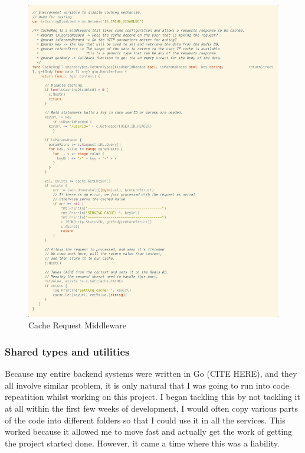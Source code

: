\documentclass[titlepage]{article}
\begin{document}
\begin{figure}
  \includegraphics[width=\textwidth]{../Diagrams/cachereq.png}
  \caption{Cache Request Middleware}
  \label{cachereq}
\end{figure}

\pagebreak
\subsubsection{Shared types and utilities}
Because my entire backend systems were written in Go (CITE HERE), and they all involve similar problem, it is only natural that I was going to run into code repeatition whilst working on this project. I began tackling this by not tackling it at all within the first few weeks of development, I would often copy various parts of the code into different folders so that I could use it in all the services. This worked because it allowed me to move fast and actually get the work of getting the project started done. However, it came a time where this was a liability. \\
\end{document}
